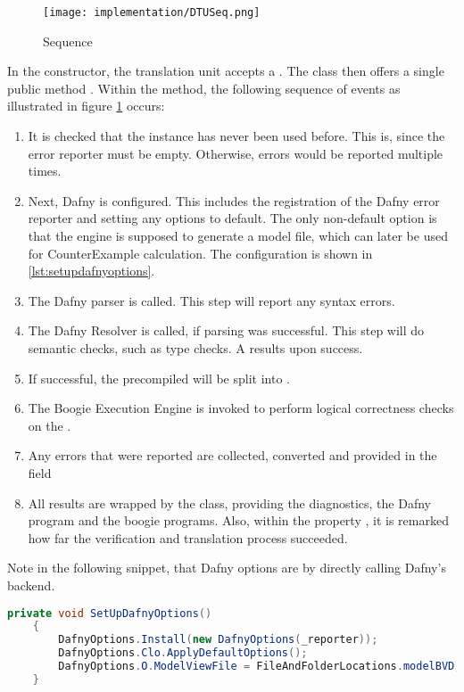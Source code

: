 \begin{figure}[H]
    \centering
    \texttt{[image: implementation/DTUSeq.png]}
    \caption{ Sequence}
    \label{fig:DTUSeq}
\end{figure}

In the constructor, the translation unit accepts a .
The class then offers a single public method .
Within the method, the following sequence of events as illustrated in figure \ref{fig:DTUSeq} occurs:

\begin{enumerate}
    \item It is checked that the instance has never been used before.
    This is, since the error reporter must be empty.
    Otherwise, errors would be reported multiple times.
    \item Next, Dafny is configured.
    This includes the registration of the Dafny error reporter and setting any options to default.
    The only non-default option is that the engine is supposed to generate a model file, which can later be used for CounterExample calculation.
    The configuration is shown in \ref{lst:setupdafnyoptions}.
    \item The Dafny parser is called.
    This step will report any syntax errors.
    \item The Dafny Resolver is called, if parsing was successful.
    This step will do semantic checks, such as type checks.
    A  results upon success.
    \item If successful, the precompiled  will be split into .
    \item The Boogie Execution Engine is invoked to perform logical correctness checks on the .
    \item Any errors that were reported are collected, converted and provided in the field 
    \item All results are wrapped by the  class, providing the diagnostics, the Dafny program and the boogie programs.
    Also, within the property , it is remarked how far the verification and translation process succeeded.
\end{enumerate}


Note in the following snippet, that Dafny options are by directly calling Dafny's backend.
\begin{lstlisting}[language=csharp, caption={Setting up Dafny Options}, captionpos=b, label={lst:setupdafnyoptions}]
    private void SetUpDafnyOptions()
    {
        DafnyOptions.Install(new DafnyOptions(_reporter));
        DafnyOptions.Clo.ApplyDefaultOptions();
        DafnyOptions.O.ModelViewFile = FileAndFolderLocations.modelBVD;
    }
\end{lstlisting}


